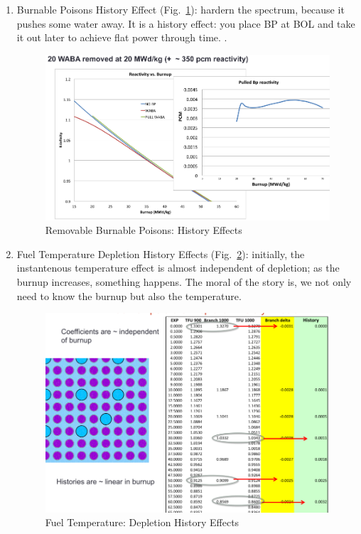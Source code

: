 \documentclass{school-22.211-notes}
\begin{document}
\clearpage
{}
\begin{enumerate}
\item Burnable Poisons History Effect (Fig.~\ref{BP-history-effect}): hardern the spectrum, because it pushes some water away. It is a history effect: you place BP at BOL and take it out later to achieve flat power through time. . 
  \begin{figure}
    \centering
    \includegraphics[width=5in]{images/dfs/BP-history-effect.png}
    \caption{Removable Burnable Poisons: History Effects}  \label{BP-history-effect}
  \end{figure}


\item Fuel Temperature Depletion History Effects (Fig.~\ref{dhe}): initially, the instantenous temperature effect is almost independent of depletion; as the burnup increases, something happens. The moral of the story is, we not only need to know the burnup but also the temperature. 
  \begin{figure}
    \centering
    \includegraphics[width=5in]{images/dfs/depletion-history-effect.png}
    \caption{Fuel Temperature: Depletion History Effects}  \label{dhe}
  \end{figure}


\end{enumerate}
\end{document}
